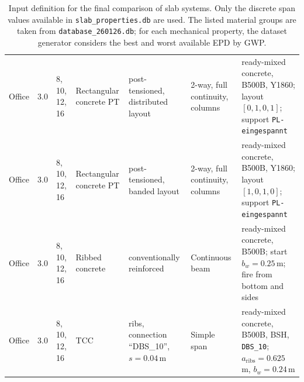 \begin{table}[t]
\begin{tabularx}{\textwidth}{@{}l|c|l|X|X|X|X@{}}
    Office & 3.0 & 8, 10, 12, 16 &
    Rectangular concrete PT &
    post-tensioned, distributed layout &
    2-way, full continuity, columns &
    ready-mixed concrete, B500B, Y1860; layout $[0,1,0,1]$; support \texttt{PL-eingespannt} \\

    Office & 3.0 & 8, 10, 12, 16 &
    Rectangular concrete PT &
    post-tensioned, banded layout &
    2-way, full continuity, columns &
    ready-mixed concrete, B500B, Y1860; layout $[1,0,1,0]$; support \texttt{PL-eingespannt} \\

    Office & 3.0 & 8, 10, 12, 16 &
    Ribbed concrete &
    conventionally reinforced &
    Continuous beam &
    ready-mixed concrete, B500B; start $b_w=0.25$\,m; fire from bottom and sides \\

    Office & 3.0 & 8, 10, 12, 16 &
    TCC &
    ribs, connection ``DBS\_10'', $s=0.04$\,m &
    Simple span &
    ready-mixed concrete, B500B, BSH, \texttt{DBS\_10}; $a_{\mathrm{ribs}}=0.625$\,m, $b_w=0.24$\,m \\ \hline
    \end{tabularx}
    \endgroup
    \caption{Input definition for the final comparison of slab systems. Only the discrete span values available in \texttt{slab\_properties.db} are used. The listed material groups are taken from \texttt{database\_260126.db}; for each mechanical property, the dataset generator considers the best and worst available EPD by GWP.}
\end{table}


